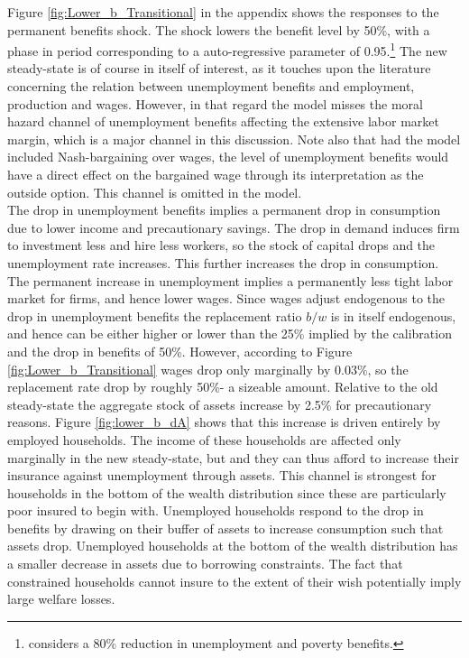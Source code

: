 \newcommand{\dBenefitRate}{50\%}

Figure \ref{fig:Lower_b_Transitional} in the appendix shows the responses to the permanent benefits shock. The shock lowers the benefit level by \dBenefitRate, with a phase in period corresponding to a auto-regressive parameter of 0.95.\footnote{\citet{mckay2016role} considers a  80\% reduction in  unemployment and poverty benefits.} The new steady-state is of course in itself of interest, as it touches upon the literature concerning the relation between unemployment benefits and employment, production and wages. However, in that regard the model misses the moral hazard channel of unemployment benefits affecting the extensive labor market margin, which is a major channel in this discussion. Note also that had the model included Nash-bargaining over wages, the level of unemployment benefits would have a direct effect on the bargained wage through its interpretation as the outside option. This channel is omitted in the model. \\

The drop in unemployment benefits implies a permanent drop in consumption due to lower income and precautionary savings. The drop in demand induces firm to investment less and hire less workers, so the stock of capital drops and the unemployment rate increases. This further increases the drop in consumption. The permanent increase in unemployment implies a permanently less tight labor market for firms, and hence lower wages. Since wages adjust endogenous to the drop in unemployment benefits the replacement ratio $b/w$ is in itself endogenous, and hence can be either higher or lower than the 25\% implied by the calibration and the drop in benefits of \dBenefitRate. However, according to Figure \ref{fig:Lower_b_Transitional} wages drop only marginally by 0.03\%, so the replacement rate drop by roughly \dBenefitRate - a sizeable amount.   
Relative to the old steady-state the aggregate stock of assets increase by 2.5\% for precautionary reasons. Figure \ref{fig:lower_b_dA} shows that this increase is driven entirely by employed households. The income of these households are affected only marginally in the new steady-state, but and they can thus afford to increase their insurance against unemployment through assets. This channel is strongest for households in the bottom of the wealth distribution since these are particularly poor insured to begin with. Unemployed households respond to the drop in benefits by drawing on their buffer of assets to increase consumption such that assets drop. Unemployed households at the bottom of the wealth distribution has a smaller decrease in assets due to borrowing constraints. The fact that constrained households cannot insure to the extent of their wish potentially imply large welfare losses. 

